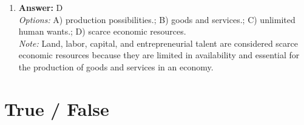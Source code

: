 \documentclass[12pt]{article}
\begin{document}
\begin{enumerate}[label=\arabic*.]
\\ \textit{Note:} Investment tax credits encourage businesses to invest in new capital, leading to increased productivity and economic growth over time.
\item \textbf{Answer:} D
\\ \textit{Options:} A) production possibilities.; B) goods and services.; C) unlimited human wants.; D) scarce economic resources.
\\ \textit{Note:} Land, labor, capital, and entrepreneurial talent are considered scarce economic resources because they are limited in availability and essential for the production of goods and services in an economy.
\end{enumerate}

\section*{True / False}
\end{document}
